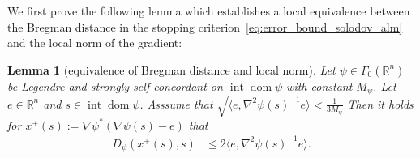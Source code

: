 \documentclass[11pt,onecolumn]{article}
\DeclareMathOperator{\dom}{dom}
\DeclareMathOperator{\intr}{int}
\newcommand{\bR}{\mathbb{R}}
\newtheorem{lemma}[lemma]{Lemma}
\theoremstyle{remark}
\begin{document}
We first prove the following lemma which establishes a local equivalence between the Bregman distance in the stopping criterion~\cref{eq:error_bound_solodov_alm} and the local norm of the gradient:
\begin{lemma}[equivalence of Bregman distance and local norm] \label{thm:self_concordance_stopping}
Let $\psi \in \Gamma_0(\bR^n)$ be Legendre and strongly self-concordant on $\intr \dom \psi$ with constant $M_\psi$. Let $e \in \bR^n$ and $s \in \intr \dom \psi$. Asssume that $\sqrt{\langle e, \nabla^2 \psi(s)^{-1} e \rangle} < \frac{1}{3M_\psi}$
Then it holds for $x^+(s):=\nabla \psi^*(\nabla \psi(s) - e)$ that
\begin{align}
D_\psi(x^+(s), s)&\leq 2 \langle e, \nabla^2 \psi(s)^{-1} e \rangle.
\end{align}
\end{lemma}
\end{document}
